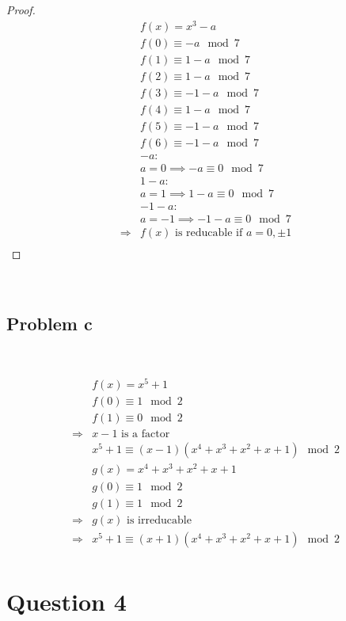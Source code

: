 \documentclass{article}
\begin{document}
\begin{proof}
    \begin{align*}
        &f(x)=x^3-a\\
        &f(0)\equiv -a\mod 7\\
        &f(1)\equiv 1-a\mod 7\\
        &f(2)\equiv 1-a\mod 7\\
        &f(3)\equiv -1-a\mod 7\\
        &f(4)\equiv 1-a\mod 7\\
        &f(5)\equiv -1-a\mod 7\\
        &f(6)\equiv -1-a\mod 7\\
        &-a:\\
        &a=0\implies -a\equiv 0\mod 7\\
        &1-a:\\
        &a=1\implies 1-a\equiv 0\mod 7\\
        &-1-a:\\
        &a=-1\implies -1-a\equiv 0\mod 7\\
        \Rightarrow&f(x)\text{ is reducable if }a=0,\pm 1\\
    \end{align*}
\end{proof}

~

\subsection*{Problem c}

~

\begin{align*}
    &f(x)=x^5+1\\
    &f(0)\equiv 1\mod 2\\
    &f(1)\equiv 0\mod 2\\
    \Rightarrow&x-1\text{ is a factor}\\
    &x^5+1\equiv(x-1)(x^4+x^3+x^2+x+1)\mod 2\\
    &g(x)=x^4+x^3+x^2+x+1\\
    &g(0)\equiv 1\mod 2\\
    &g(1)\equiv 1\mod2\\
    \Rightarrow&g(x)\text{ is irreducable}\\
    \Rightarrow&x^5+1\equiv (x+1)(x^4+x^3+x^2+x+1)\mod 2\\
\end{align*}

\newpage

\section*{Question 4}
\end{document}
